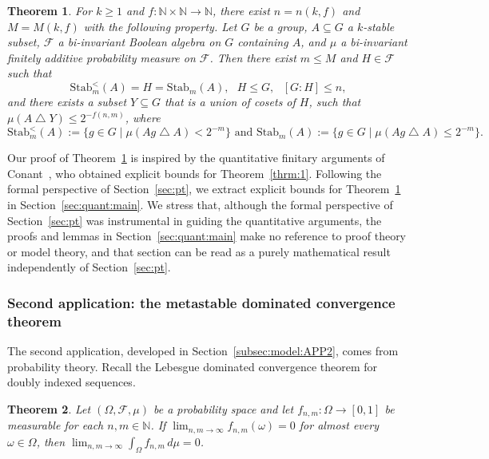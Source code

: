 \documentclass[11pt]{amsart}
\newtheorem{theorem}{Theorem}[section]
\theoremstyle{definition}
\theoremstyle{remark}
\def\NN{\mathbb{N}}
\begin{document}
\begin{theorem}
\label{thrm:meta:main:strong}
For $k \ge 1$ and $f:\NN \times \NN \to \NN$, there exist $n = n(k,f)$ and
$M = M(k,f)$ with the following property. Let $G$ be a group, $A \subseteq G$
a $k$-stable subset, $\mathcal{F}$ a bi-invariant Boolean algebra on $G$
containing $A$, and $\mu$ a bi-invariant finitely additive probability measure
on $\mathcal{F}$. Then there exist $m \le M$ and $H \in \mathcal{F}$ such that
\[
  \mathrm{Stab}_m^{<}(A) = H = \mathrm{Stab}_m(A),\mbox{ } H \le G,\mbox{ } [G:H] \le n,
\]
and there exists a subset $Y \subseteq G$ that is a union of cosets of $H$,
such that $\mu(A \mathbin{\triangle} Y) \le 2^{-f(n,m)}$, where
\[
  \mathrm{Stab}_m^{<}(A) := \{ g \in G \mid \mu(Ag \mathbin{\triangle} A) < 2^{-m} \} \mbox{ and }
  \mathrm{Stab}_m(A) := \{ g \in G \mid \mu(Ag \mathbin{\triangle} A) \le 2^{-m} \}.
\]
\end{theorem}

Our proof of Theorem~\ref{thrm:meta:main:strong} is inspired by the
quantitative finitary arguments of Conant~\cite{conant2021quantitative}, who
obtained explicit bounds for Theorem~\ref{thrm:1}. Following the formal
perspective of Section~\ref{sec:pt}, we extract explicit bounds for
Theorem~\ref{thrm:meta:main:strong} in Section~\ref{sec:quant:main}. We
stress that, although the formal perspective of Section~\ref{sec:pt} was
instrumental in guiding the quantitative arguments, the proofs and lemmas in
Section~\ref{sec:quant:main} make no reference to proof theory or model
theory, and that section can be read as a purely mathematical result
independently of Section~\ref{sec:pt}.

\subsubsection*{Second application: the metastable dominated convergence theorem}

The second application, developed in Section~\ref{subsec:model:APP2}, comes
from probability theory. Recall the Lebesgue dominated convergence theorem
for doubly indexed sequences.

\begin{theorem}
\label{thrm:DCT}
Let $(\Omega,\mathcal{F},\mu)$ be a probability space and let
$f_{n,m}\colon\Omega\to[0,1]$ be measurable for each $n,m \in \NN$. If
$\lim_{n,m\to\infty}f_{n,m}(\omega) = 0$ for almost every $\omega\in\Omega$,
then $\lim_{n,m\to\infty}\int_\Omega f_{n,m}\,d\mu = 0$.
\end{theorem}
\end{document}

